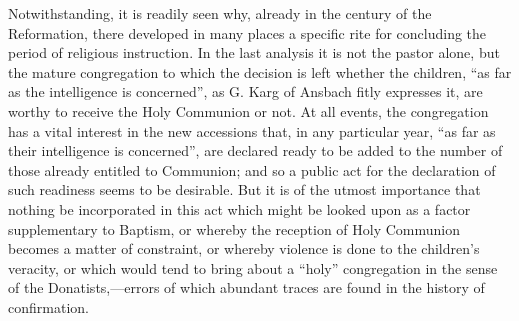 Notwithstanding, it is readily seen why, already in the century of the Reformation, there developed in many places a specific rite for concluding the period of religious instruction. In the last analysis it is not the pastor alone, but the mature congregation to which the decision is left whether the children, “as far as the intelligence is concerned”, as G. Karg of Ansbach fitly expresses it, are worthy to receive the Holy Communion or not. At all events, the congregation has a vital interest in the new accessions that, in any particular year, “as far as their intelligence is concerned”, are declared ready to be added to the number of those already entitled to Communion; and so a public act for the declaration of such readiness seems to be desirable. But it is of the utmost importance that nothing be incorporated in this act which might be looked upon as a factor supplementary to Baptism, or whereby the reception of Holy Communion becomes a matter of constraint, or whereby violence is done to the children’s veracity, or which would tend to bring about a “holy” congregation in the sense of the Donatists,—errors of which abundant traces are found in the history of confirmation.

